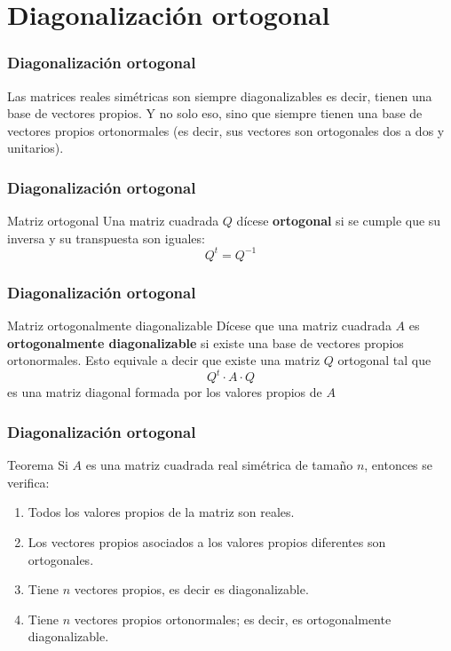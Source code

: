 \documentclass{beamer}
\begin{document}
\section{Diagonalizaci\'on ortogonal}




\begin{frame}
\frametitle{Diagonalizaci\'on ortogonal}
Las matrices reales sim\'etricas son siempre diagonalizables es decir, tienen una base de vectores propios. Y no solo eso, sino que siempre tienen una base de vectores propios ortonormales (es decir, sus vectores son ortogonales dos a dos y unitarios). 

\end{frame}

\begin{frame}
\frametitle{Diagonalizaci\'on ortogonal}
\begin{block}{Matriz ortogonal}
Una matriz cuadrada $Q$ d\'icese \textbf{ortogonal} si se cumple que su inversa y su transpuesta son iguales:
\[Q^t = Q^{-1}\]
\end{block}
\end{frame}

\begin{frame}
\frametitle{Diagonalizaci\'on ortogonal}
\begin{block}{Matriz ortogonalmente diagonalizable}
D\'icese que una matriz cuadrada $A$ es \textbf{ortogonalmente diagonalizable} si existe una base de vectores propios ortonormales. Esto equivale a decir que existe una matriz $Q$ ortogonal tal que \[Q^t\cdot A\cdot Q\] es una matriz diagonal formada por los valores propios de $A$
\end{block}
\end{frame}


\begin{frame}
\frametitle{Diagonalizaci\'on ortogonal}
\begin{block}{Teorema}
Si $A$ es una matriz cuadrada real sim\'etrica de tama\~no $n$, entonces se verifica:
\begin{enumerate}
\item Todos los valores propios de la matriz son reales.
\item Los vectores propios asociados a los valores propios diferentes son ortogonales.
\item Tiene $n$ vectores propios, es decir es diagonalizable. 
\item Tiene $n$ vectores propios ortonormales; es decir, es ortogonalmente diagonalizable.
\end{enumerate}
\end{block}
\end{frame}
\end{document}
